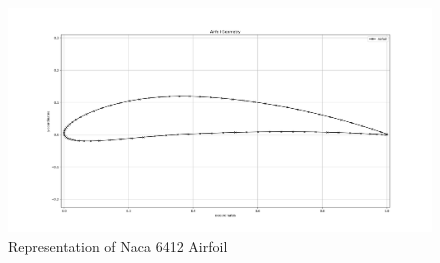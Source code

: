 \begin{figure}[H]\centering
\includegraphics[scale=\size]{Content/Images/Naca_6412_Diag.png}
\caption{Representation of Naca 6412 Airfoil}
\label{Naca 6412 Sketch}
\end{figure}





